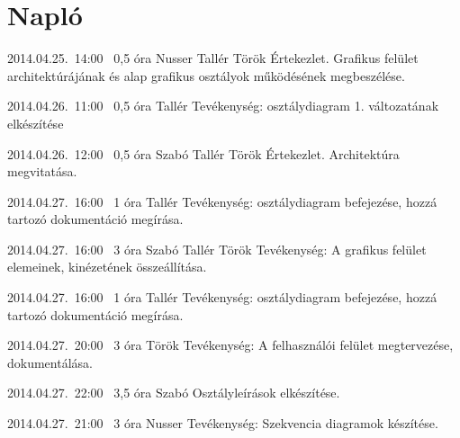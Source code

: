 %
\section{Napló}

\begin{naplo}

\bejegyzes
{2014.04.25.~14:00~}
{0,5 óra}
{Nusser\newline
Tallér\newline
Török}
{Értekezlet. Grafikus felület architektúrájának és alap grafikus osztályok működésének megbeszélése.}

\bejegyzes
{2014.04.26.~11:00~}
{0,5 óra}
{Tallér}
{Tevékenység: osztálydiagram 1. változatának elkészítése}

\bejegyzes
{2014.04.26.~12:00~}
{0,5 óra}
{Szabó\newline
Tallér\newline
Török}
{Értekezlet. Architektúra megvitatása.}

\bejegyzes
{2014.04.27.~16:00~}
{1 óra}
{Tallér}
{Tevékenység: osztálydiagram befejezése, hozzá tartozó dokumentáció megírása.}

\bejegyzes
{2014.04.27.~16:00~}
{3 óra}
{Szabó\newline
Tallér\newline
Török\newline}
{Tevékenység: A grafikus felület elemeinek, kinézetének összeállítása.}

\bejegyzes
{2014.04.27.~16:00~}
{1 óra}
{Tallér}
{Tevékenység: osztálydiagram befejezése, hozzá tartozó dokumentáció megírása.}

\bejegyzes
{2014.04.27.~20:00~}
{3 óra}
{Török}
{Tevékenység: A felhasználói felület megtervezése, dokumentálása.}

\bejegyzes
{2014.04.27.~22:00~} %
{3,5 óra} %
{Szabó} %
{Osztályleírások elkészítése.} %

\bejegyzes
{2014.04.27.~21:00~}
{3 óra}
{Nusser}
{Tevékenység: Szekvencia diagramok készítése.}

\end{naplo}
